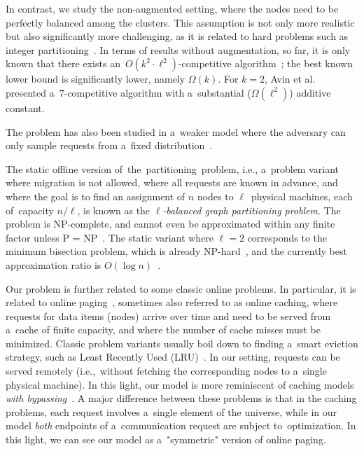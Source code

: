 \documentclass[a4paper,anonymous,USenglish]{lipics-v2019}
\begin{document}
In contrast, we study the non-augmented setting, where the nodes need to be perfectly balanced  among the clusters.
This assumption is not only more realistic but also significantly more challenging, as it is related to hard problems such as integer partitioning~\cite{integer-partitions-book}.
In terms of results without augmentation, so far, it is only known that there exists an~$O(k^2 \cdot \ell^2)$-competitive algorithm~\cite{repartition-disc}; the best known lower bound is significantly lower, namely $\Omega(k)$.
For $k=2$, Avin et al.~\cite{repartition-disc} presented a~$7$-competitive algorithm with a~substantial ($\Omega(\ell^2)$) additive constant.


The problem has also been studied in a~weaker
model where the adversary can only sample
requests from a~fixed distribution~\cite{stochastic-ring}.

The static offline version of~the~partitioning~problem, i.e., a~problem variant where
migration is not allowed, where all requests are known in advance, and where
the goal is to find an assignment of $n$ nodes to $\ell$~physical machines, each of~capacity $n/\ell$, is known as the
\emph{$\ell$-balanced graph partitioning problem}. The problem is 
NP-complete, and cannot even be approximated within any finite factor unless P
= NP~\cite{AndRae06}.  The static
variant where $\ell = 2$ corresponds to the minimum bisection problem, which
is already NP-hard~\cite{GaJoSt76}, and 
the currently best approximation ratio is $O(\log n)$~\cite{SarVaz95,ArKaKa99,FeKrNi00,FeiKra02,KraFei06,Raec08}.

Our problem is further related to some classic online problems.
In particular, it is related to online paging~\cite{SleTar85,FKLMSY91,McGSle91,AcChNo00}, sometimes also referred to
as online caching, where requests for data items (nodes) arrive over time and
need to be served from a~cache of finite capacity, and where the number of
cache misses must be minimized. Classic problem variants usually boil down to
finding a~smart eviction strategy, such as Least Recently Used (LRU)~\cite{SleTar85}. In our
setting, requests can be served remotely (i.e.,~without fetching the
corresponding nodes to a~single physical machine). In this light, our model is more
reminiscent of caching models \emph{with
bypassing}~\cite{EpImLN11,EpImLN15,Irani02}.
A major difference between  these problems is that in the caching problems, each request involves a~single element of the universe, while in our model \emph{both} endpoints of a~communication request are subject to~optimization.
In this light, we can see our model as a~"symmetric" version of online paging.
\end{document}

